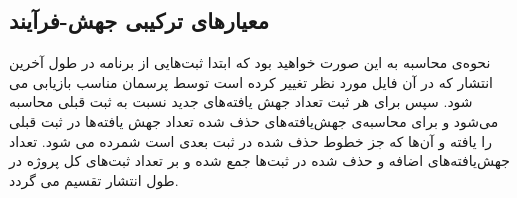\subsection{معیارهای ترکیبی جهش-فرآیند}

نحوه‌ی محاسبه به این صورت خواهید بود که ابتدا ثبت‌هایی از برنامه در طول آخرین انتشار که در آن فایل مورد نظر تغییر کرده است  توسط  پرسمان   مناسب بازیابی می شود. سپس برای هر ثبت تعداد جهش یافته‌های جدید نسبت به ثبت قبلی محاسبه می‌شود و برای محاسبه‌ی جهش‌یافته‌های حذف شده تعداد جهش یافته‌ها در  ثبت قبلی را یافته و آن‌ها که جز خطوط حذف شده در ثبت بعدی است شمرده می شود. تعداد جهش‌یافته‌های اضافه و حذف شده در ثبت‌ها جمع شده و بر تعداد ثبت‌های کل پروژه در طول انتشار تقسیم می گردد.

\begin{comment}

\begin{latin}
\begin{lstlisting}[language=SQL]
SELECT CC.* from CommitChangedFile CC, CommitInfo CI where CC.COMMIT_INFO_ID = CI.ID
AND CI.SEQUENCE_NUMBER BETWEEN :startSeq AND :endSeq
AND CI.PROJECT = :project
AND CC.FILE_NAME = :fileName ORDER BY CI.SEQUENCE_NUMBER asc
\end{lstlisting}
\end{latin}
\captionof{lstlisting}{بازیابی اطلاعات ثبت‌هایی که یک فایل در بازه‌ی مشخص در آنها تغییر کرده است}
\label{code:commit-during-release}
\end{comment}